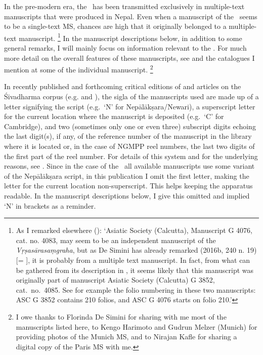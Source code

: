 \noindent
In the pre-modern era, the \VSS\ has been transmitted exclusively in multiple-text manuscripts that were produced in Nepal. Even when a
manuscript of the \VSS\ seems to be a single-text MS, 
chances are high that it originally belonged to a multiple-text
manuscript.%
	\footnote{\label{noteonKolkataMs}As I remarked elsewhere 
	():
	`Asiatic Society (Calcutta), Manuscript G 4076, cat. no. 4083, 
	may seem to be an independent manuscript of the 
	\textit{Vṛṣasārasaṃgraha}, but as De Simini has already 
	remarked (2016b, 240 n. 19) [= ],
	it is probably from a multiple text manuscript. In fact, from what
	can be gathered from its description in
	,
	it seems likely that this manuscript was
	originally part of manuscript Asiatic Society (Calcutta) G 3852, cat.\
	no.\ 4085. See for example the folio numbering in these two 
	manuscripts: ASC G 3852 contains 210 folios, 
	and ASC G 4076 starts on folio 210.'}
In the manuscript descriptions below, in addition to some general
remarks, I will mainly focus on information relevant to the \VSS. For
much more detail on the overall features of these manuscripts, see 
\mycite{DeSiminiMSSFromNepal2016} and the catalogues I mention
at some of the individual manuscript.%
		\footnote{I owe thanks to Florinda De Simini for 
			sharing with me most of the manuscripts listed here, to
  			Kengo Harimoto and Gudrun Melzer (Munich) for 
  			providing photos of the  Munich MS, and to 
  			Nirajan Kafle for sharing a digital 
  			copy of the Paris MS with me.}

In recently published and forthcoming critical editions of and articles
on the Śivadharma corpus 
(e.g.  and 
), 
the sigla of the manuscripts used are made up of 
a letter signifying the script (e.g.~`N' for
Nepālākṣara/Newari), a superscript letter for the current location where
the manuscript is deposited (e.g.~`C' for Cambridge), and two (sometimes only one or even three) subscript digits echoing the last digit(s), if any, of the reference number of the manuscript in the 
library where it is located or, in the case of NGMPP reel 
numbers, the last two digits of the first part of the reel number. 
For details of this system and for the underlying reasons, see 
. 
Since in the case of the \VSS\ all available 
manuscripts use some variant of the Nepālākṣara script, 
in this publication I omit the first letter, making the letter for the current 
location non-superscript. This helps keeping the apparatus 
readable. In the manuscript descriptions below, I give this 
omitted and implied `N' in brackets as a reminder.

